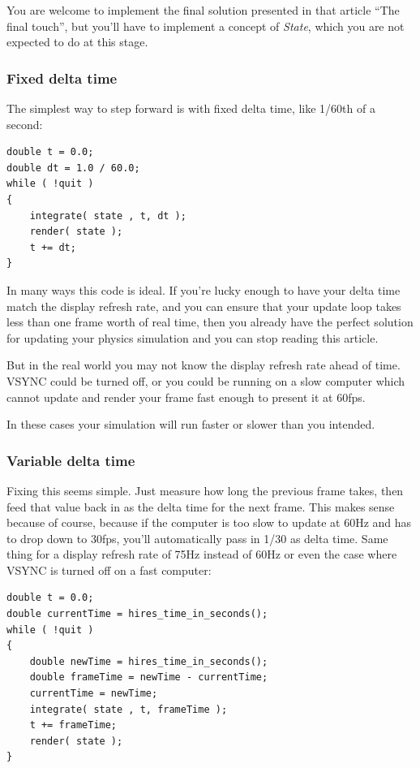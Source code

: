 \documentclass[12pt]{article}
\begin{document}
You are welcome to implement the final solution presented in that article ``The final touch'', but you'll have to implement a concept of \emph{State}, which you are not expected to do at this stage.

\subsubsection*{Fixed delta time}

The simplest way to step forward is with fixed delta time, like 1/60th of a second:

\begin{minipage}{\linewidth}\begin{lstlisting}
double t = 0.0;
double dt = 1.0 / 60.0;
while ( !quit )
{
	integrate( state , t, dt );
	render( state );
	t += dt;
}
\end{lstlisting}\end{minipage}

In many ways this code is ideal. If you're lucky enough to have your delta time match the display refresh rate, and you can ensure that your update loop takes less than one frame worth of real time, then you already have the perfect solution for updating your physics simulation and you can stop reading this article. 

But in the real world you may not know the display refresh rate ahead of time. VSYNC could be turned off, or you could be running on a slow computer which cannot update and render your frame fast enough to present it at 60fps. 

In these cases your simulation will run faster or slower than you intended. 

\subsubsection*{Variable delta time}

Fixing this seems simple. Just measure how long the previous frame takes, then feed that value back in as the delta time for the next frame. This makes sense because of course, because if the computer is too slow to update at 60Hz and has to drop down to 30fps, you'll automatically pass in 1/30 as delta time. Same thing for a display refresh rate of 75Hz instead of 60Hz or even the case where VSYNC is turned off on a fast computer: 

\begin{minipage}{\linewidth}\begin{lstlisting}
double t = 0.0;
double currentTime = hires_time_in_seconds();
while ( !quit )
{
	double newTime = hires_time_in_seconds();
	double frameTime = newTime - currentTime;
	currentTime = newTime;
	integrate( state , t, frameTime );
	t += frameTime;
	render( state );
}
\end{lstlisting}\end{minipage}
\end{document}
